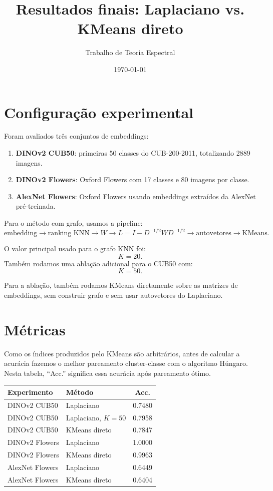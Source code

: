 \documentclass[11pt,a4paper]{article}
\title{Resultados finais: Laplaciano vs. KMeans direto}
\author{Trabalho de Teoria Espectral}
\date{\today}
\begin{document}
\maketitle

\section{Configuração experimental}

Foram avaliados três conjuntos de embeddings:

\begin{enumerate}
    \item \textbf{DINOv2 CUB50}: primeiras 50 classes do CUB-200-2011, totalizando 2889 imagens.
    \item \textbf{DINOv2 Flowers}: Oxford Flowers com 17 classes e 80 imagens por classe.
    \item \textbf{AlexNet Flowers}: Oxford Flowers usando embeddings extraídos da AlexNet pré-treinada.
\end{enumerate}

Para o método com grafo, usamos a pipeline:
\[
\text{embedding} \rightarrow \text{ranking KNN} \rightarrow W \rightarrow
L = I - D^{-1/2}WD^{-1/2} \rightarrow \text{autovetores} \rightarrow \text{KMeans}.
\]

O valor principal usado para o grafo KNN foi:
\[
K=20.
\]
Também rodamos uma ablação adicional para o CUB50 com:
\[
K=50.
\]

Para a ablação, também rodamos KMeans diretamente sobre as matrizes de embeddings,
sem construir grafo e sem usar autovetores do Laplaciano.

\section{Métricas}

Como os índices produzidos pelo KMeans são arbitrários, antes de calcular a
acurácia fazemos o melhor pareamento cluster-classe com o algoritmo Húngaro.
Nesta tabela, ``Acc.'' significa essa acurácia após pareamento ótimo.

\begin{center}
\begin{tabular}{llc}
\toprule
Experimento & Método & Acc.\\
\midrule
DINOv2 CUB50 & Laplaciano & 0.7480\\
DINOv2 CUB50 & Laplaciano, \(K=50\) & 0.7958\\
DINOv2 CUB50 & KMeans direto & 0.7847\\
\midrule
DINOv2 Flowers & Laplaciano & 1.0000\\
DINOv2 Flowers & KMeans direto & 0.9963\\
\midrule
AlexNet Flowers & Laplaciano & 0.6449\\
AlexNet Flowers & KMeans direto & 0.6404\\
\bottomrule
\end{tabular}
\end{center}
\end{document}
